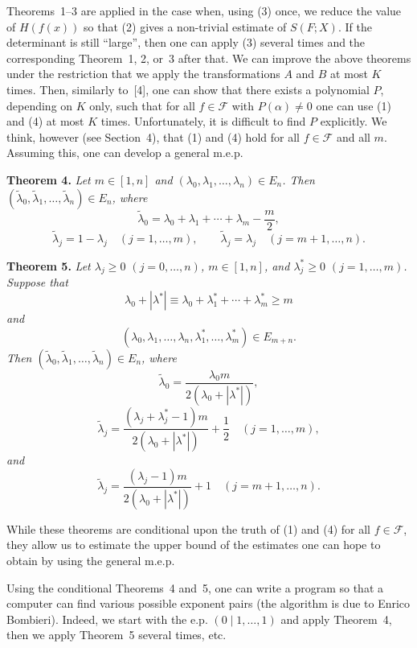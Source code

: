 \documentclass[10pt]{article}
\begin{document}
Theorems~1--3 are applied in the case when, using (3) once, we reduce the value of $H(f(x))$ so that (2) gives a non-trivial estimate of $S(F;X)$. If the determinant is still ``large'', then one can apply (3) several times and the corresponding Theorem~1, 2, or~3 after that. We can improve the above theorems under the restriction that we apply the transformations $A$ and $B$ at most $K$ times. Then, similarly to~[4], one can show that there exists a polynomial $P$, depending on $K$ only, such that for all $f\in\mathscr F$ with $P(\alpha)\ne0$ one can use (1) and (4) at most $K$ times. Unfortunately, it is difficult to find $P$ explicitly. We think, however (see Section~4), that (1) and (4) hold for all $f\in\mathscr F$ and all $m$. Assuming this, one can develop a general m.e.p.

\medskip
\noindent\textbf{Theorem 4.}
\textit{Let $m\in[1,n]$ and $(\lambda_0,\lambda_1,\ldots,\lambda_n)\in E_n$. Then $(\widetilde\lambda_0,\widetilde\lambda_1,\ldots,\widetilde\lambda_n)\in E_n$, where
\[
  \widetilde\lambda_0=\lambda_0+\lambda_1+\cdots+\lambda_m-\frac m2,
\]
\[
  \widetilde\lambda_j=1-\lambda_j\quad(j=1,\ldots,m),
  \qquad
  \widetilde\lambda_j=\lambda_j\quad(j=m+1,\ldots,n).
\]}

\medskip
\noindent\textbf{Theorem 5.}
\textit{Let $\lambda_j\geqslant0$ $(j=0,\ldots,n)$, $m\in[1,n]$, and $\lambda_j^*\geqslant0$ $(j=1,\ldots,m)$. Suppose that
\[
  \lambda_0+|\lambda^*|\equiv\lambda_0+\lambda_1^*+\cdots+\lambda_m^*\geqslant m
\]
and
\[
  (\lambda_0,\lambda_1,\ldots,\lambda_n,\lambda_1^*,\ldots,\lambda_m^*)\in E_{m+n}.
\]
Then $(\widetilde\lambda_0,\widetilde\lambda_1,\ldots,\widetilde\lambda_n)\in E_n$, where
\[
  \widetilde\lambda_0=\frac{\lambda_0m}{2(\lambda_0+|\lambda^*|)},
\]
\[
  \widetilde\lambda_j=
  \frac{(\lambda_j+\lambda_j^*-1)m}{2(\lambda_0+|\lambda^*|)}+\frac12
  \quad(j=1,\ldots,m),
\]
and
\[
  \widetilde\lambda_j=
  \frac{(\lambda_j-1)m}{2(\lambda_0+|\lambda^*|)}+1
  \quad(j=m+1,\ldots,n).
\]}

While these theorems are conditional upon the truth of (1) and (4) for all $f\in\mathscr F$, they allow us to estimate the upper bound of the estimates one can hope to obtain by using the general m.e.p.

Using the conditional Theorems~4 and~5, one can write a program so that a computer can find various possible exponent pairs (the algorithm is due to Enrico Bombieri). Indeed, we start with the e.p. $(0\mid1,\ldots,1)$ and apply Theorem~4, then we apply Theorem~5 several times, etc.
\end{document}
